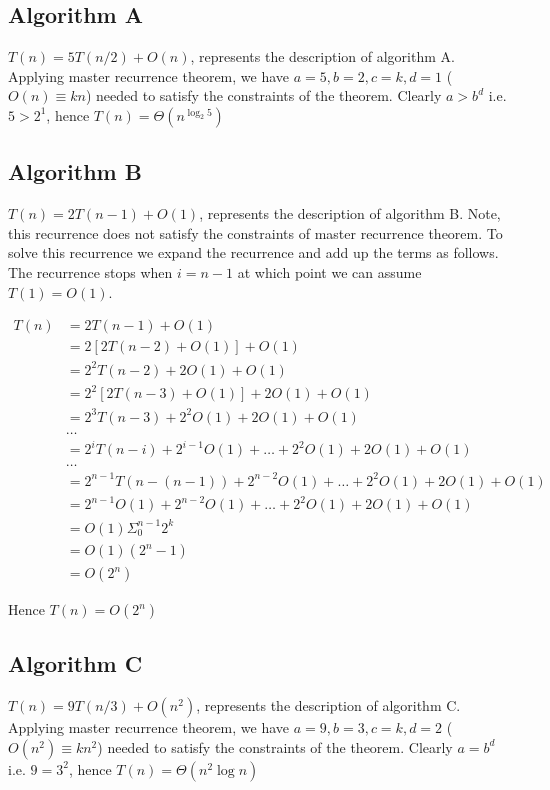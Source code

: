 \documentclass{article}
\begin{document}
    \subsection*{Algorithm A}
    $T(n) = 5T(n/2) + O(n)$, represents the description of algorithm A. Applying master recurrence theorem, we have $a = 5, b = 2, c = k, d = 1$ ($O(n) \equiv kn$) needed to satisfy the constraints of the theorem. Clearly $a > b^d$ i.e. $5 > 2^1$, hence $T(n) = \Theta(n^{\log_2 5})$

    \subsection*{Algorithm B}
    $T(n) = 2T(n-1) + O(1)$, represents the description of algorithm B. Note, this recurrence does not satisfy the constraints of master recurrence theorem. To solve this recurrence we expand the recurrence and add up the terms as follows. The recurrence stops when $i = n-1$ at which point we can assume $T(1) = O(1)$.

    \begin{equation*}
        \begin{split}
            T(n)
            & = 2T(n-1) + O(1) \\
            & = 2[2T(n-2) + O(1)] + O(1) \\
            & = 2^2T(n-2) + 2O(1) + O(1) \\
            & = 2^2[2T(n-3) + O(1)] + 2O(1) + O(1) \\
            & = 2^3T(n-3) + 2^2O(1) + 2O(1) + O(1) \\
            & \dots \\
            & = 2^iT(n-i) + 2^{i-1}O(1) + \dots + 2^2O(1) + 2O(1) + O(1) \\
            & \dots \\
            & = 2^{n-1}T(n-(n-1)) + 2^{n-2}O(1) + \dots + 2^2O(1) + 2O(1) + O(1) \\
            & = 2^{n-1}O(1) + 2^{n-2}O(1) + \dots + 2^2O(1) + 2O(1) + O(1) \\
            & = O(1) \Sigma_{0}^{n-1} 2^k \\
            & = O(1) (2^n - 1) \\
            & = O(2^n)
        \end{split}
    \end{equation*}

    Hence $T(n) = O(2^n)$

    \subsection*{Algorithm C}
    $T(n) = 9T(n/3) + O(n^2)$, represents the description of algorithm C. Applying master recurrence theorem, we have $a = 9, b = 3, c = k, d = 2$ ($O(n^2) \equiv kn^2$) needed to satisfy the constraints of the theorem. Clearly $a = b^d$ i.e. $9 = 3^2$, hence $T(n) = \Theta(n^2 \log n)$
\end{document}
